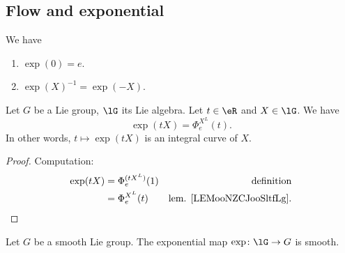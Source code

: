 \subsection{Flow and exponential}

\begin{lemma}       \label{LEMooEQFHooRjUAin}
We have
\begin{enumerate}
\item
\( \exp(0)=e\).
\item \label{ITEMooTQHIooFLaOnX}
\( \exp(X)^{-1}=\exp(-X)\).
\end{enumerate}
\end{lemma}


\begin{lemma}        \label{LEMooGKDKooFTsDSr}
	Let \( G\) be a Lie group, \( \lG\) its Lie algebra. Let \( t\in \eR\) and \( X\in\lG\). We have
	\begin{equation}
		\exp(tX)=\Phi_e^{X^L}(t).
	\end{equation}
	In other words, \( t\mapsto \exp(tX)\) is an integral curve of \( X\).
\end{lemma}

\begin{proof}
	Computation:
	\begin{subequations}
		\begin{align}
			\exp(tX) & =\Phi_e^{(tX^L)}(1) & \text{definition}                    \\
			         & =\Phi_e^{X^L}(t)    & \text{lem. \ref{LEMooNZCJooSltfLg}}.
		\end{align}
	\end{subequations}
\end{proof}

\begin{proposition}       \label{PROPooMIMZooAwxvkB}
	Let \( G\) be a smooth Lie group. The exponential map \( \exp\colon \lG\to G\) is smooth.
\end{proposition}

